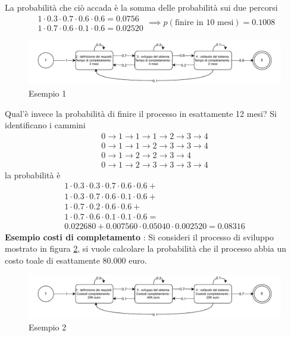 \documentclass[10pt, letterpaper]{report}
\begin{document}
La probabilità che ciò accada è la somma delle probabilità sui due percorsi 
$$ \begin{matrix}
    1\cdot 0.3 \cdot 0.7 \cdot 0.6 \cdot 0.6 = 0.0756 \\ 
    1\cdot  0.7 \cdot0.6 \cdot0.1 \cdot0.6 = 0.02520
\end{matrix} \implies p(\text{finire in 10 mesi})=0.1008$$
\begin{figure}[h!]
    \centering 
    \includegraphics[width=1\textwidth ]{images/esempioDTMC.pdf}
    \caption{Esempio 1}
    \label{esempioDTMC}
\end{figure}\acc 
Qual'è invece la probabilità di finire il processo in esattamente 12 mesi? Si identificano i cammini 
$$ \begin{matrix}
    0\rightarrow1\rightarrow1\rightarrow1\rightarrow2\rightarrow3\rightarrow4\\ 
    0\rightarrow1\rightarrow1\rightarrow2\rightarrow3\rightarrow3\rightarrow4 \\ 
    0\rightarrow1\rightarrow2\rightarrow2\rightarrow3\rightarrow4\\ 
    0\rightarrow1\rightarrow2\rightarrow3\rightarrow3\rightarrow3\rightarrow4
\end{matrix}$$
la probabilità è 
$$\begin{matrix} 1 \cdot 0.3 \cdot 0.3 \cdot 0.7 \cdot 0.6 \cdot 0.6 
    + \\1 \cdot 0.3 \cdot 0.7 \cdot 0.6 \cdot 0.1 \cdot 0.6 +\\
1 \cdot 0.7 \cdot 0.2 \cdot 0.6 \cdot 0.6 + \\
1 \cdot 0.7 \cdot 0.6 \cdot 0.1 \cdot 0.1 \cdot 0.6 =\\
0.022680 + 0.007560 \cdot 0.05040 \cdot 0.002520 =
0.08316\end{matrix}$$
\textbf{Esempio costi di completamento} : Si consideri il processo di sviluppo mostrato in figura \ref{esempioDTMC2}, si vuole 
calcolare la probabilità che il processo abbia un costo toale di esattamente 80.000 euro.\begin{figure}[h!]
    \centering 
    \includegraphics[width=1\textwidth ]{images/esempioDTMC2.pdf}
    \caption{Esempio 2}
    \label{esempioDTMC2}
\end{figure}\acc 
\end{document}
